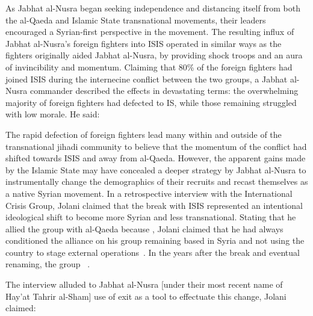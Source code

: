 As Jabhat al-Nusra began seeking independence and distancing itself from both the al-Qaeda and Islamic State transnational movements, their leaders encouraged a Syrian-first perspective in the movement. The resulting influx of Jabhat al-Nusra's foreign fighters into ISIS operated in similar ways as the fighters originally aided Jabhat al-Nusra, by providing shock troops and an aura of invincibility and momentum.  Claiming that 80\% of the foreign fighters had joined ISIS during the internecine conflict between the two groups, a Jabhat al-Nusra commander described the effects in devastating terms: the overwhelming majority of foreign fighters had defected to IS, while those remaining struggled with low morale. He said:  ~\autocite{ahad2013nusra}

The rapid defection of foreign fighters lead many within and outside of the transnational jihadi community to believe that the momentum of the conflict had shifted towards ISIS and away from al-Qaeda. However, the apparent gains made by the Islamic State may have concealed a deeper strategy by Jabhat al-Nusra to instrumentally change the demographics of their recruits and recast themselves as a native Syrian movement. In a retrospective interview with the International Crisis Group, Jolani claimed that the break with ISIS represented an intentional ideological shift to become more Syrian and less transnational. Stating that he allied the group with al-Qaeda because , Jolani claimed that he had always conditioned the alliance on his group remaining based in Syria and not using the country to stage external operations~\autocite{icg2020conversation}. In the years after the break and eventual renaming, the group ~\autocite{icg2020conversation}.

The interview alluded to Jabhat al-Nusra [under their most recent name of Hay'at Tahrir al-Sham] use of exit as a tool to effectuate this change, Jolani claimed: 

